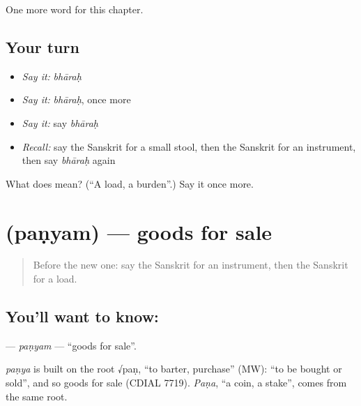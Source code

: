 \begin{grammarlens}[title={What you've built}]
One more word for this chapter.
\end{grammarlens}

\subsection*{Your turn}
\begin{itemize}
\raggedright
  \item \emph{Say it:} \emph{bhāraḥ}
  \item \emph{Say it:} \emph{bhāraḥ}, once more
  \item \emph{Say it:} say \emph{bhāraḥ}
  \item \emph{Recall:} say the Sanskrit for a small stool, then the Sanskrit for an instrument, then say \emph{bhāraḥ} again
\end{itemize}

\begin{tcolorbox}[breakable,colback=teal!4,colframe=teal!35!black,title={Before you move on}]
What does  mean? (\textquotedblleft{}A load, a burden\textquotedblright{}.) Say it once more.
\end{tcolorbox}
\section[\texorpdfstring{\sk{पण्यम्} (paṇyam)}{पण्यम् (paṇyam)}]{ (paṇyam) — goods for sale}

\label{lesson:SA-C222-panyam}



\begin{quote}
Before the new one: say the Sanskrit for an instrument, then the Sanskrit for a load.
\end{quote}

\subsection*{You'll want to know: }
\textbf{} — \emph{paṇyam} — \textquotedblleft{}goods for sale\textquotedblright{}.

\begin{cousinweb}
\emph{paṇya} is built on the root √paṇ, \textquotedblleft{}to barter, purchase\textquotedblright{} (MW): \textquotedblleft{}to be bought or sold\textquotedblright{}, and so goods for sale (CDIAL 7719). \emph{Paṇa}, \textquotedblleft{}a coin, a stake\textquotedblright{}, comes from the same root.
\end{cousinweb}

